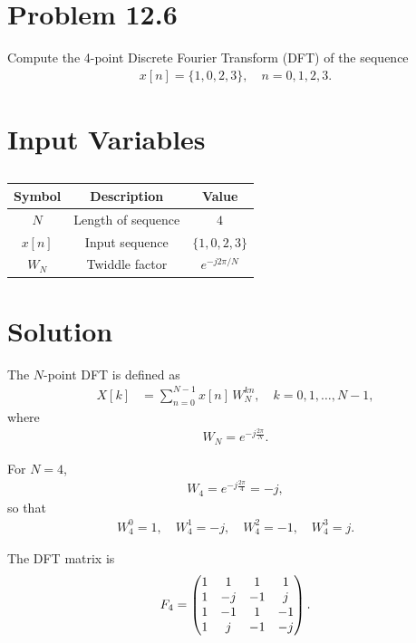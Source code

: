 \documentclass[12pt]{article}
\begin{document}
\section*{Problem 12.6}
Compute the 4-point Discrete Fourier Transform (DFT) of the sequence
\begin{align}
x[n] = \{1,0,2,3\}, \quad n=0,1,2,3.
\end{align}


\section*{Input Variables}

\begin{table}[H]
\centering
\begin{tabular}{|c|c|c|}
\hline
\textbf{Symbol} & \textbf{Description} & \textbf{Value} \\
\hline
$N$ & Length of sequence & $4$ \\
\hline
$x[n]$ & Input sequence & $\{1,0,2,3\}$ \\
\hline
$W_N$ & Twiddle factor & $e^{-j2\pi/N}$ \\
\hline
\end{tabular}
\caption{} \label{}
\end{table}

\section*{Solution}

The $N$-point DFT is defined as
\begin{align}
    X[k] &= \sum_{n=0}^{N-1} x[n] \, W_N^{kn}, \quad k=0,1,\dots,N-1,
\end{align}
where
\begin{align}
    W_N = e^{-j \tfrac{2\pi}{N}}.
\end{align}

For $N=4$,
\begin{align}
    W_4 = e^{-j \tfrac{2\pi}{4}} = -j,
\end{align}
so that
\begin{align}
    W_4^0 = 1, \quad W_4^1 = -j, \quad W_4^2 = -1, \quad W_4^3 = j.
\end{align}

The DFT matrix is
\begin{align}
F_4 = \begin{pmatrix}
1 & 1 & 1 & 1 \\
1 & -j & -1 & j \\
1 & -1 & 1 & -1 \\
1 & j & -1 & -j
\end{pmatrix}.
\end{align}
\end{document}
